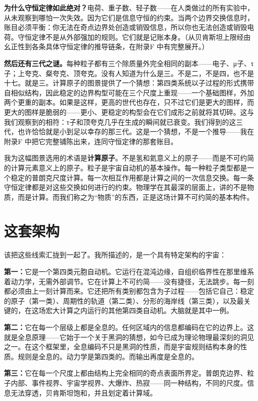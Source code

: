 \documentclass[11pt, twoside, openright]{book}
\begin{document}
\textbf{为什么守恒定律如此绝对？}电荷、重子数、轻子数------在人类做过的所有实验中，从未观察到哪怕一次失效。因为它们是信息守恒的约束。当两个边界交换信息时，账目必须平衡：你无法在奇点边界处创造或销毁信息，所以你也无法创造或销毁电荷。守恒定律不是从外部强加的规则。它们就是记账本身。（从贝肯斯坦上限经由幺正性到各条具体守恒定律的推导链条，在附录F 中有完整展开。）

\textbf{然后还有三代之谜。}每种粒子都有三个除质量外完全相同的副本------电子、μ子、τ子；上夸克、粲夸克、顶夸克。没有人知道为什么是三。不是二，不是四，也不是十七。就是三。计算原子的图景提供了一个猜想：第四类系统以子过程的形式携带自相似结构，因此稳定的边界构型可能在三个尺度上重现------一个基础图样，外加两个更重的副本。如果是这样，更高的世代也存在，只不过它们是更大的图样，而更大的图样是脆弱的------更小、更稳定的构型会在它们成形之前就将其切碎。这与我们观察到的相符：τ子和顶夸克几乎在生成的瞬间就已衰变。我们得到的这三代，也许恰恰就是小到足以幸存的那三代。这是一个猜想，不是一个推导------我在附录F 中把它完整铺陈出来，连同守恒定律的那套账目。

我为这幅图景选用的术语是\textbf{计算原子}。不是氢和氦意义上的原子------而是不可约简的计算元素意义上的原子。粒子是宇宙自动机的基本操作。每一种粒子类型都是一个稳定的普朗克尺度计算。每一次相互作用都是计算之间的一次信息交换。每一条守恒定律都是对这些交换如何进行的约束。物理学在其最深的层面上，讲的不是物质，而是计算。而我们称之为“物质”的东西，正是这场计算不可约简的基本构件。


\section*{这套架构}

该把这些线索汇拢到一起了。我所描述的，是一个具有特定架构的宇宙：

\textbf{第一：}它是一个第四类元胞自动机。它运行在混沌边缘，自组织临界性在那里维系着动力学，无需外部调节。它在计算上不可约简------没有捷径，无法跳步。每一刻都必须由上一刻计算而来。它还把所有类别都包含为子过程------包括它自己：稳定的原子（第一类）、周期性的轨道（第二类）、分形的海岸线（第三类），以及最关键的，在这场宏大计算之内运行的其他第四类自动机。大脑就是其中一例。

\textbf{第二：}它在每一个层级上都是全息的。任何区域内的信息都编码在它的边界上。这就是全息原理------它始于一个关于黑洞的猜想，如今已成为理论物理最深刻的洞见之一。在这个框架里，全息编码不只是黑洞的性质，而是宇宙规则结构本身的性质。规则是全息的。动力学是第四类的。而输出再度是全息的。

\textbf{第三：}它在每一个尺度上都由结构上完全相同的奇点表面所界定。普朗克边界、粒子内部、事件视界、宇宙学视界、大爆炸、热寂------同一种结构，不同的尺度。信息无法穿透，贝肯斯坦饱和，并且划定着计算域。
\end{document}
